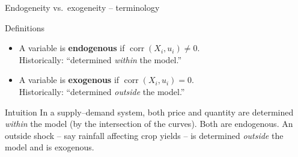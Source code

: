 \documentclass[10pt]{beamer}
\begin{document}
\begin{frame}{Endogeneity vs.\ exogeneity -- terminology}
\label{slide:terminology}
\begin{block}{Definitions}
\begin{itemize}
  \item A variable is \textbf{endogenous} if $\operatorname{corr}(X_i, u_i) \neq 0$.\\
        {\small Historically: ``determined \emph{within} the model.''}
  \item A variable is \textbf{exogenous} if $\operatorname{corr}(X_i, u_i) = 0$.\\
        {\small Historically: ``determined \emph{outside} the model.''}
\end{itemize}
\end{block}

\pause
\begin{exampleblock}{Intuition}
In a supply--demand system, both price and quantity are determined \emph{within} the model (by the intersection of the curves). Both are endogenous. An outside shock -- say rainfall affecting crop yields -- is determined \emph{outside} the model and is exogenous.
\end{exampleblock}
\end{frame}
\end{document}
